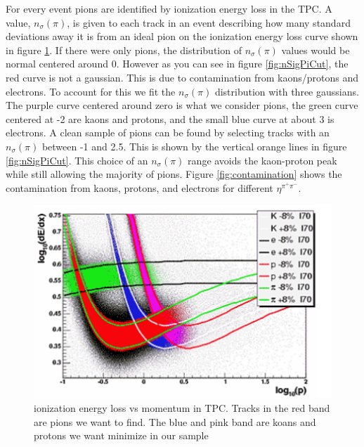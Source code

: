 \documentclass[abstract = on,listof=totoc, bibliography=totoc]{scrreprt}
\begin{document}
For every event pions are identified by ionization energy loss in the TPC. A value, $n_\sigma(\pi)$, is given to each track in an event describing how many standard deviations away it is from an ideal pion on the ionization energy loss curve shown in figure \ref{fig:dedx}. If there were only pions, the distribution of $n_\sigma(\pi)$ values would be normal centered around 0. However as you can see in figure \ref{fig:nSigPiCut}, the red curve is not a gaussian. This is due to contamination from kaons/protons and electrons. To account for this we fit the $n_\sigma(\pi)$ distribution with three gaussians. The purple curve centered around zero is what we consider pions, the green curve centered at -2 are kaons and protons, and the small blue curve at about 3 is electrons. A clean sample of pions can be found by selecting tracks with an $n_\sigma(\pi)$ between -1 and 2.5. This is shown by the vertical orange lines in figure \ref{fig:nSigPiCut}. This choice of an $n_\sigma(\pi)$ range avoids the kaon-proton peak while still allowing the majority of pions. Figure  \ref{fig:contamination} shows the contamination from kaons, protons, and electrons for different $\eta^{\pi^+\pi^-}$.

\begin{figure}
\begin{center}
\includegraphics[width = 1\textwidth]{dedxforPID}
\caption[Ionization energy loss in TPC gas on log scale]{ionization energy loss vs momentum in TPC. Tracks in the red band are pions we want to find. The blue and pink band are koans and protons we want minimize in our sample}
\label{fig:dedx}
\end{center}
\end{figure}
\end{document}
